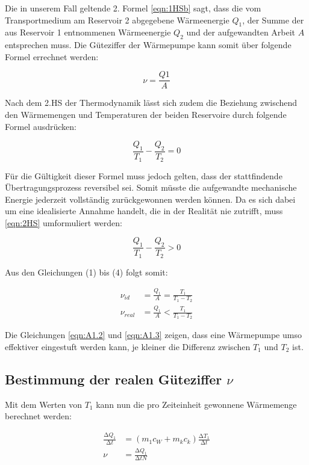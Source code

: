 Die in unserem Fall geltende 2. Formel \eqref{eqn:1HSb} sagt, dass die vom Transportmedium am Reservoir 2 abgegebene
Wärmeenergie $Q_1$, der Summe der aus Reservoir 1 entnommenen Wärmeenergie $Q_2$ und der aufgewandten Arbeit $A$
entsprechen muss. Die Güteziffer der Wärmepumpe kann somit über folgende Formel errechnet werden:

\begin{equation}
  \nu = \frac{Q1}{A}
\end{equation}

Nach dem 2.HS der Thermodynamik lässt sich zudem die Beziehung zwischend den Wärmemengen und Temperaturen der
beiden Reservoire durch folgende Formel ausdrücken:

\begin{equation}
  \label{eqn:2HS}
  \frac{Q_1}{T_1} - \frac{Q_2}{T_2} = 0
\end{equation}

Für die Gültigkeit dieser Formel muss jedoch gelten, dass der stattfindende Übertragungsprozess reversibel sei.
Somit müsste die aufgewandte mechanische Energie jederzeit vollständig zurückgewonnen werden können. Da es
sich dabei um eine idealisierte Annahme handelt, die in der Realität nie zutrifft, muss \eqref{eqn:2HS}
umformuliert werden:

\begin{equation}
  \label{eqn:2HS1}
  \frac{Q_1}{T_1} - \frac{Q_2}{T_2} > 0
\end{equation}

Aus den Gleichungen (1) bis (4) folgt somit:

\begin{align}
  \nu_{id}   &= \frac{Q_1}{A} = \frac{T_1}{T_1 - T_2} \label{eqn:A1.2} \\
  \nu_{real} &= \frac{Q_1}{A} < \frac{T_1}{T_1 - T_2} \label{eqn:A1.3}
\end{align}

Die Gleichungen \eqref{eqn:A1.2} und \eqref{eqn:A1.3} zeigen, dass eine Wärmepumpe umso effektiver eingestuft werden
kann, je kleiner die Differenz zwischen $T_1$ und $T_2$ ist.

\subsection{Bestimmung der realen Güteziffer \texorpdfstring{$\nu$}{z}}

Mit dem Werten von $T_1$ kann nun die pro Zeiteinheit gewonnene Wärmemenge berechnet werden:

\begin{align}
  \label{eqn:Gueteziffer}
  \frac{\increment Q_1}{\increment t} &= (m_1c_W + m_kc_k) \frac{\increment T_1}{\increment t} \\
  \label{eqn:Güte_theo}
  \nu                                 &= \frac{\increment Q_1}{\increment t N}
\end{align}

